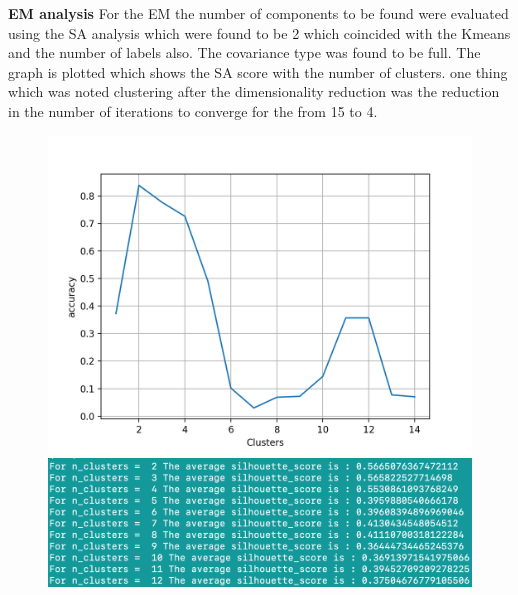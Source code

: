 \documentclass[a4paper,12pt]{article}
\begin{document}
\textbf{EM analysis } For the EM the number of components to be found were evaluated using the SA analysis which were found to be 2 which coincided with the Kmeans and the number of labels also. The covariance type was found to be full. The graph is plotted which shows the SA score with the number of clusters. one thing which was noted clustering after the dimensionality reduction was the reduction in the number of iterations to converge for the from 15 to 4.\newline
\begin{figure}[!htb]
   \begin{minipage}{0.33\textwidth}
     \centering
     \includegraphics[width=.95\linewidth]{kmeans_ica_dataset1_accuracy}
   \end{minipage}\hfill
    \begin{minipage}{0.33\textwidth}
     \centering
     \includegraphics[width=.95\linewidth]{kmeans_ica_dataset1_sil}
     \end{minipage}\hfill
     \begin{minipage}{0.33\textwidth}
     \centering

\end{minipage}
\end{figure}
\end{document}
